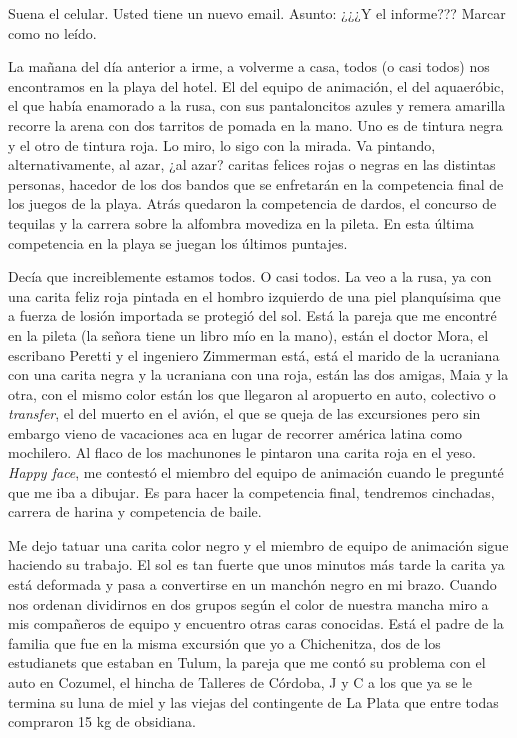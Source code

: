 \documentclass[12pt,twoside,openright,a5paper]{book}
\begin{document}
Suena el celular. Usted tiene un nuevo email. Asunto: ¿¿¿Y el informe??? Marcar como no leído.



\vspace{0.5cm}
\hrulefill\hspace{0.2cm} \decofourleft\decofourright \hspace{0.2cm} \hrulefill
\vspace{0.5cm}

La mañana del día anterior a irme, a volverme a casa, todos (o casi todos)
nos encontramos en la playa del hotel. El del equipo de animación, el
del aquaeróbic, el que había enamorado a la rusa, con sus pantaloncitos
azules y remera amarilla recorre la arena con dos tarritos de pomada en la
mano. Uno es de tintura negra y el otro de tintura roja. Lo miro, lo sigo
con la mirada. Va pintando, alternativamente, al azar, ¿al azar? caritas
felices rojas o negras en las distintas personas, hacedor de los dos bandos
que se enfretarán en la competencia final de los juegos de la playa. Atrás
quedaron la competencia de dardos, el concurso de tequilas y la carrera
sobre la alfombra movediza en la pileta. En esta última competencia en la
playa se juegan los últimos puntajes.

Decía que increiblemente estamos todos. O casi todos. La veo a la rusa,
ya con una carita feliz roja pintada en el hombro izquierdo de una piel
planquísima que a fuerza de losión importada se protegió del sol. Está
la pareja que me encontré en la pileta (la señora tiene un libro mío
en la mano), están el doctor Mora, el escribano Peretti y el ingeniero
Zimmerman está, está el marido de la ucraniana con una carita negra y la
ucraniana con una roja, están las dos amigas, Maia y la otra, con el mismo
color están los que llegaron al aropuerto en auto, colectivo o \emph{transfer},
el del muerto en el avión, el que se queja de las excursiones pero sin
embargo vieno de vacaciones aca en lugar de recorrer américa latina como
mochilero. Al flaco de los machunones le pintaron una carita roja en el
yeso. \emph{Happy face}, me contestó el miembro del equipo de animación cuando
le pregunté que me iba a dibujar. Es para hacer la competencia final,
tendremos cinchadas, carrera de harina y competencia de baile.

Me dejo tatuar una carita color negro y el miembro de equipo de animación
sigue haciendo su trabajo. El sol es tan fuerte que unos minutos más tarde
la carita ya está deformada y pasa a convertirse en un manchón negro en mi
brazo. Cuando nos ordenan dividirnos en dos grupos según el color de nuestra
mancha miro a mis compañeros de equipo y encuentro otras caras
conocidas. Está el padre de la familia que fue en la misma excursión que
yo a Chichenitza, dos de los estudianets que estaban en Tulum, la pareja
que me contó su problema con el auto en Cozumel, el hincha de Talleres
de Córdoba, J y C a los que ya se le termina su luna de miel y las viejas
del contingente de La Plata que entre todas compraron 15 kg de obsidiana.
\end{document}

